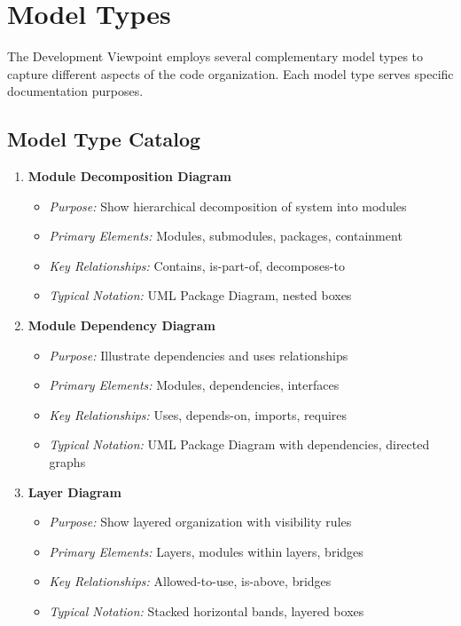 \documentclass[11pt,letterpaper]{article}
\begin{document}
\section{Model Types}

The Development Viewpoint employs several complementary model types to capture different aspects of the code organization. Each model type serves specific documentation purposes.

\subsection{Model Type Catalog}

\begin{enumerate}[label=\textbf{MT\arabic*:}, leftmargin=2.5em]
    \item \textbf{Module Decomposition Diagram}
    \begin{itemize}[nosep]
        \item \textit{Purpose:} Show hierarchical decomposition of system into modules
        \item \textit{Primary Elements:} Modules, submodules, packages, containment
        \item \textit{Key Relationships:} Contains, is-part-of, decomposes-to
        \item \textit{Typical Notation:} UML Package Diagram, nested boxes
    \end{itemize}
    
    \item \textbf{Module Dependency Diagram}
    \begin{itemize}[nosep]
        \item \textit{Purpose:} Illustrate dependencies and uses relationships
        \item \textit{Primary Elements:} Modules, dependencies, interfaces
        \item \textit{Key Relationships:} Uses, depends-on, imports, requires
        \item \textit{Typical Notation:} UML Package Diagram with dependencies, directed graphs
    \end{itemize}
    
    \item \textbf{Layer Diagram}
    \begin{itemize}[nosep]
        \item \textit{Purpose:} Show layered organization with visibility rules
        \item \textit{Primary Elements:} Layers, modules within layers, bridges
        \item \textit{Key Relationships:} Allowed-to-use, is-above, bridges
        \item \textit{Typical Notation:} Stacked horizontal bands, layered boxes
    \end{itemize}
    

\end{enumerate}
\end{document}
